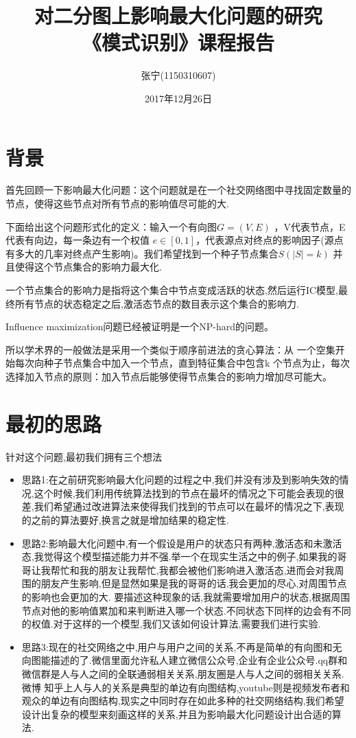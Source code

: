 \documentclass[11pt, a4paper]{article}
\begin{document}
\title{\textbf{对二分图上影响最大化问题的研究}\\《模式识别》课程报告}
  \author{张宁(1150310607)}
  \date{2017年12月26日}
  \maketitle
  \section{背景}
  首先回顾一下影响最大化问题：这个问题就是在一个社交网络图中寻找固定数量的节点，使得这些节点对所有节点的影响值尽可能的大.

  下面给出这个问题形式化的定义：输入一个有向图$G = (V,E)$ ，V代表节点，E代表有向边，每一条边有一个权值 $e \in [0,1]$，代表源点对终点的影响因子(源点有多大的几率对终点产生影响)。我们希望找到一个种子节点集合$S(|S|=k)$ 并且使得这个节点集合的影响力最大化.

  一个节点集合的影响力是指将这个集合中节点变成活跃的状态,然后运行IC模型,最终所有节点的状态稳定之后,激活态节点的数目表示这个集合的影响力.

  Influence maximization问题已经被证明是一个NP-hard的问题。

  所以学术界的一般做法是采用一个类似于顺序前进法的贪心算法：从 一个空集开始每次向种子节点集合中加入一个节点，直到特征集合中包含k 个节点为止，每次选择加入节点的原则：加入节点后能够使得节点集合的影响力增加尽可能大。

  \section{最初的思路}
  针对这个问题,最初我们拥有三个想法

  \begin{itemize}
  \item 思路1:在之前研究影响最大化问题的过程之中,我们并没有涉及到影响失效的情况,这个时候,我们利用传统算法找到的节点在最坏的情况之下可能会表现的很差,我们希望通过改进算法来使得我们找到的节点可以在最坏的情况之下,表现的之前的算法要好,换言之就是增加结果的稳定性.
  \item 思路2:影响最大化问题中,有一个假设是用户的状态只有两种,激活态和未激活态,我觉得这个模型描述能力并不强.举一个在现实生活之中的例子,如果我的哥哥让我帮忙和我的朋友让我帮忙,我都会被他们影响进入激活态,进而会对我周围的朋友产生影响,但是显然如果是我的哥哥的话,我会更加的尽心,对周围节点的影响也会更加的大. 要描述这种现象的话,我就需要增加用户的状态,根据周围节点对他的影响值累加和来判断进入哪一个状态.不同状态下同样的边会有不同的权值.对于这样的一个模型,我们又该如何设计算法,需要我们进行实验.
  \item 思路3:现在的社交网络之中,用户与用户之间的关系,不再是简单的有向图和无向图能描述的了.微信里面允许私人建立微信公众号,企业有企业公众号.qq群和微信群是人与人之间的全联通弱相关关系,朋友圈是人与人之间的弱相关关系.微博 知乎上人与人的关系是典型的单边有向图结构,youtube则是视频发布者和观众的单边有向图结构,现实之中同时存在如此多种的社交网络结构,我们希望设计出复杂的模型来刻画这样的关系,并且为影响最大化问题设计出合适的算法.
  \end{itemize}
\end{document}
